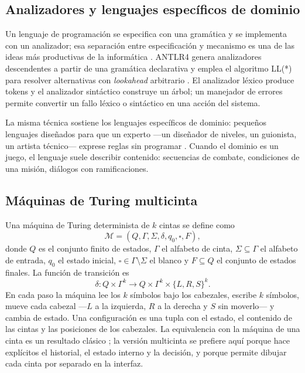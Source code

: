 \documentclass[9pt]{ieeeconf}
\newcommand{\TM}{\mathcal{M}}
\begin{document}
\subsection{Analizadores y lenguajes específicos de dominio}
\label{sec:analizadores}

Un lenguaje de programación se especifica con una gramática y se implementa con un analizador; esa separación entre especificación y mecanismo es una de las ideas más productivas de la informática \cite{aho2006,grune2008,scott2015}. ANTLR4 genera analizadores descendentes a partir de una gramática declarativa y emplea el algoritmo LL(*) para resolver alternativas con \emph{lookahead} arbitrario \cite{parr2013,antlr2026}. El analizador léxico produce tokens y el analizador sintáctico construye un árbol; un manejador de errores permite convertir un fallo léxico o sintáctico en una acción del sistema.

La misma técnica sostiene los lenguajes específicos de dominio: pequeños lenguajes diseñados para que un experto ---un diseñador de niveles, un guionista, un artista técnico--- exprese reglas sin programar \cite{scott2015}. Cuando el dominio es un juego, el lenguaje suele describir contenido: secuencias de combate, condiciones de una misión, diálogos con ramificaciones.

\subsection{Máquinas de Turing multicinta}
\label{sec:tm}

Una máquina de Turing determinista de $k$ cintas se define como
\begin{equation}
  \TM=(Q,\Gamma,\Sigma,\delta,q_0,\square,F),
  \label{eq:tm}
\end{equation}
donde $Q$ es el conjunto finito de estados, $\Gamma$ el alfabeto de cinta, $\Sigma\subseteq\Gamma$ el alfabeto de entrada, $q_0$ el estado inicial, $\square\in\Gamma\setminus\Sigma$ el blanco y $F\subseteq Q$ el conjunto de estados finales. La función de transición es
\begin{equation}
  \delta: Q\times\Gamma^k \longrightarrow Q\times\Gamma^k\times\{L,R,S\}^k.
  \label{eq:delta}
\end{equation}
En cada paso la máquina lee los $k$ símbolos bajo los cabezales, escribe $k$ símbolos, mueve cada cabezal ---$L$ a la izquierda, $R$ a la derecha y $S$ sin moverlo--- y cambia de estado. Una configuración es una tupla con el estado, el contenido de las cintas y las posiciones de los cabezales. La equivalencia con la máquina de una cinta es un resultado clásico \cite{hopcroft2006,sipser2012}; la versión multicinta se prefiere aquí porque hace explícitos el historial, el estado interno y la decisión, y porque permite dibujar cada cinta por separado en la interfaz.
\end{document}
